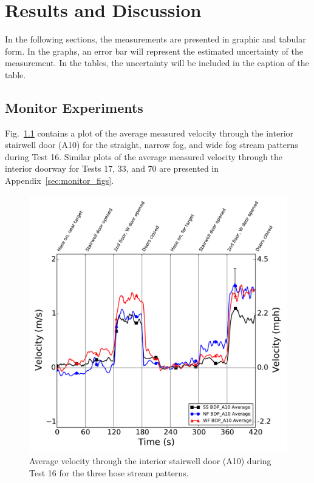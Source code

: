 \documentclass[12pt,oneside]{book}
\begin{document}

\chapter{Results and Discussion}
\label{chap:results}
In the following sections, the measurements are presented in graphic and tabular form. In the graphs, an error bar will represent the estimated uncertainty of the measurement. In the tables, the uncertainty will be included in the caption of the table.

\section{Monitor Experiments}
\label{sec:monitor_results}

Fig.~\ref{fig:Test_16_BDP_A10_Avg_All} contains a plot of the average measured velocity through the interior stairwell door (A10) for the straight, narrow fog, and wide fog stream patterns during Test 16. Similar plots of the average measured velocity through the interior doorway for Tests 17, 33, and 70 are presented in Appendix~\ref{sec:monitor_figs}.

\begin{figure}[!ht]
	\includegraphics[width=\columnwidth]{../Figures/Plots/Test_16_West_063014_BDP_A10_stream_avgs}
	\caption{Average velocity through the interior stairwell door (A10) during Test 16 for the three hose stream patterns.}
	\label{fig:Test_16_BDP_A10_Avg_All}
\end{figure}
\end{document}
